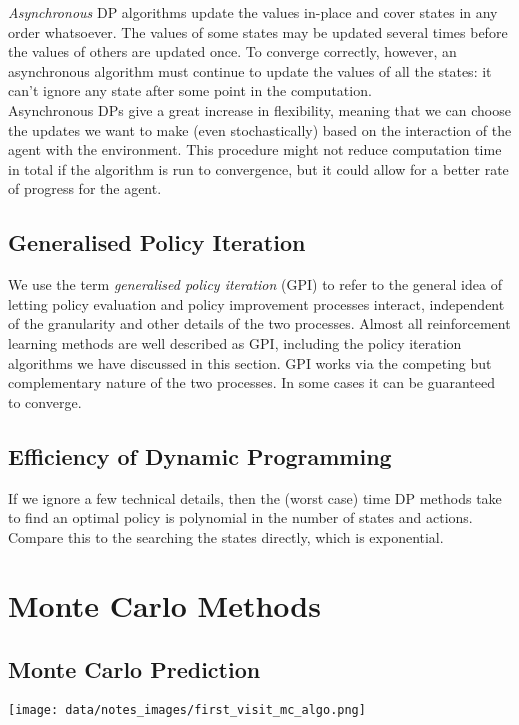 \emph{Asynchronous} DP algorithms update the values in-place and cover states in any order whatsoever. The values of some states may be updated several times before the values of others are updated once. To converge correctly, however, an asynchronous algorithm must continue to update the values of all the states: it can’t ignore any state after some point in the computation.\\

Asynchronous DPs give a great increase in flexibility, meaning that we can choose the updates we want to make (even stochastically) based on the interaction of the agent with the environment. This procedure might not reduce computation time in total if the algorithm is run to convergence, but it could allow for a better rate of progress for the agent.

\subsection{Generalised Policy Iteration}
We use the term \emph{generalised policy iteration} (GPI) to refer to the general idea of letting policy evaluation and policy improvement processes interact, independent of the granularity and other details of the two processes. Almost all reinforcement learning methods are well described as GPI, including the policy iteration algorithms we have discussed in this section. GPI works via the competing but complementary nature of the two processes. In some cases it can be guaranteed to converge. 

\subsection{Efficiency of Dynamic Programming}
If we ignore a few technical details, then the (worst case) time DP methods take to find an optimal policy is polynomial in the number of states and actions. Compare this to the searching the states directly, which is exponential.


\clearpage
\section{Monte Carlo Methods}


\subsection{Monte Carlo Prediction}
\texttt{[image: data/notes\_images/first\_visit\_mc\_algo.png]}


